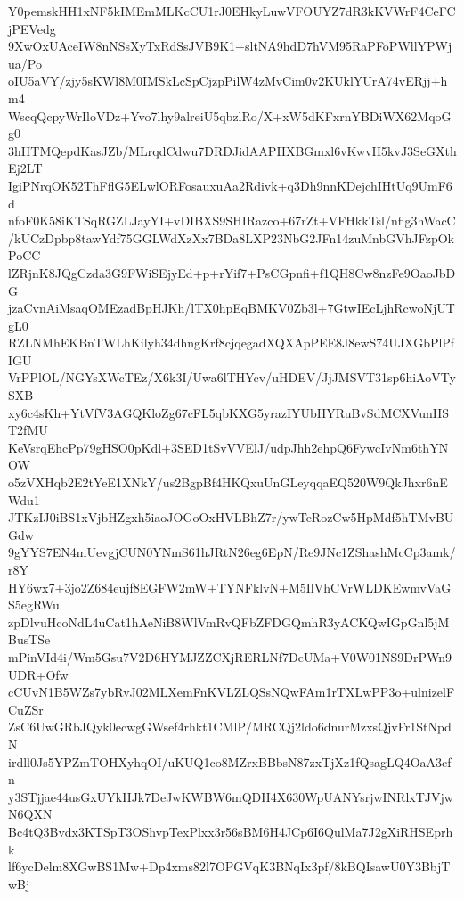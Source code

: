 Y0pemskHH1xNF5kIMEmMLKcCU1rJ0EHkyLuwVFOUYZ7dR3kKVWrF4CeFCjPEVedg
9XwOxUAceIW8nNSsXyTxRdSsJVB9K1+sltNA9hdD7hVM95RaPFoPWllYPWjua/Po
oIU5aVY/zjy5sKWl8M0IMSkLcSpCjzpPilW4zMvCim0v2KUklYUrA74vERjj+hm4
WscqQcpyWrIloVDz+Yvo7lhy9alreiU5qbzlRo/X+xW5dKFxrnYBDiWX62MqoGg0
3hHTMQepdKasJZb/MLrqdCdwu7DRDJidAAPHXBGmxl6vKwvH5kvJ3SeGXthEj2LT
IgiPNrqOK52ThFflG5ELwlORFosauxuAa2Rdivk+q3Dh9nnKDejchIHtUq9UmF6d
nfoF0K58iKTSqRGZLJayYI+vDIBXS9SHIRazco+67rZt+VFHkkTsl/nflg3hWacC
/kUCzDpbp8tawYdf75GGLWdXzXx7BDa8LXP23NbG2JFn14zuMnbGVhJFzpOkPoCC
lZRjnK8JQgCzda3G9FWiSEjyEd+p+rYif7+PsCGpnfi+f1QH8Cw8nzFe9OaoJbDG
jzaCvnAiMsaqOMEzadBpHJKh/lTX0hpEqBMKV0Zb3l+7GtwIEcLjhRcwoNjUTgL0
RZLNMhEKBnTWLhKilyh34dhngKrf8cjqegadXQXApPEE8J8ewS74UJXGbPlPfIGU
VrPPlOL/NGYsXWcTEz/X6k3I/Uwa6lTHYcv/uHDEV/JjJMSVT31sp6hiAoVTySXB
xy6c4sKh+YtVfV3AGQKloZg67cFL5qbKXG5yrazIYUbHYRuBvSdMCXVunHST2fMU
KeVsrqEhcPp79gHSO0pKdl+3SED1tSvVVElJ/udpJhh2ehpQ6FywcIvNm6thYNOW
o5zVXHqb2E2tYeE1XNkY/us2BgpBf4HKQxuUnGLeyqqaEQ520W9QkJhxr6nEWdu1
JTKzIJ0iBS1xVjbHZgxh5iaoJOGoOxHVLBhZ7r/ywTeRozCw5HpMdf5hTMvBUGdw
9gYYS7EN4mUevgjCUN0YNmS61hJRtN26eg6EpN/Re9JNc1ZShashMcCp3amk/r8Y
HY6wx7+3jo2Z684eujf8EGFW2mW+TYNFklvN+M5IlVhCVrWLDKEwmvVaGS5egRWu
zpDlvuHcoNdL4uCat1hAeNiB8WlVmRvQFbZFDGQmhR3yACKQwIGpGnl5jMBusTSe
mPinVId4i/Wm5Gsu7V2D6HYMJZZCXjRERLNf7DcUMa+V0W01NS9DrPWn9UDR+Ofw
cCUvN1B5WZs7ybRvJ02MLXemFnKVLZLQSsNQwFAm1rTXLwPP3o+ulnizelFCuZSr
ZsC6UwGRbJQyk0ecwgGWsef4rhkt1CMlP/MRCQj2ldo6dnurMzxsQjvFr1StNpdN
irdll0Js5YPZmTOHXyhqOI/uKUQ1co8MZrxBBbsN87zxTjXz1fQsagLQ4OaA3cfn
y3STjjae44usGxUYkHJk7DeJwKWBW6mQDH4X630WpUANYsrjwINRlxTJVjwN6QXN
Bc4tQ3Bvdx3KTSpT3OShvpTexPlxx3r56sBM6H4JCp6I6QulMa7J2gXiRHSEprhk
lf6ycDelm8XGwBS1Mw+Dp4xms82l7OPGVqK3BNqIx3pf/8kBQIsawU0Y3BbjTwBj
